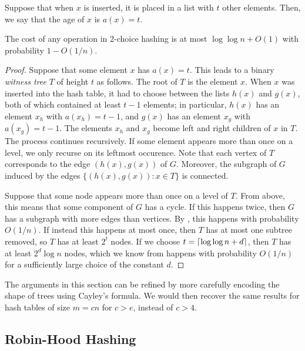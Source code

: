 \documentclass{patmorin}
\begin{document}
Suppose that when $x$ is inserted, it is placed in a list with $t$
other elements. Then, we say that the age of $x$ is $a(x) = t$.
\begin{thm}
  The cost of any operation in 2-choice hashing is at most
  $\log \log n + O(1)$ with probability $1 - O(1/n)$.
\end{thm}
\begin{proof}
  Suppose that some element $x$ has $a(x) = t$. This leads to a binary
  \emph{witness tree} $T$ of height $t$ as follows.  The root of $T$
  is the element $x$. When $x$ was inserted into the hash table, it
  had to choose between the lists $h(x)$ and $g(x)$, both of which
  contained at least $t - 1$ elements; in particular, $h(x)$ has an
  element $x_h$ with $a(x_h) = t - 1$, and $g(x)$ has an element $x_g$
  with $a(x_g) = t - 1$. The elements $x_h$ and $x_g$ become left and
  right children of $x$ in $T$. The process continues recursively. If
  some element appears more than once on a level, we only recurse on
  its leftmost occurence. Note that each vertex of $T$ corresponds to
  the edge $(h(x), g(x))$ of $G$. Moreover, the subgraph of $G$
  induced by the edges $\{(h(x), g(x)) : x \in T\}$ is connected.

  Suppose that some node appears more than once on a level of
  $T$. From above, this means that some component of $G$ has a
  cycle. If this happens twice, then $G$ has a subgraph with more
  edges than vertices. By , this happens
  with probability $O(1/n)$. If instead this happens at most once,
  then $T$ has at most one subtree removed, so $T$ has at least $2^t$
  nodes. If we choose $t = {\lceil \log \log n + d \rceil}$, then $T$ has at
  least $2^d \log n$ nodes, which we know from
   happens with probability $O(1/n)$
  for a sufficiently large choice of the constant $d$.
\end{proof}

\begin{rem}
  The arguments in this section can be refined by more carefully
  encoding the shape of trees using Cayley's formula. We would then
  recover the same results for hash tables of size $m = cn$ for
  $c > e$, instead of $c > 4$.
\end{rem}

\subsection{Robin-Hood Hashing}
\end{document}
